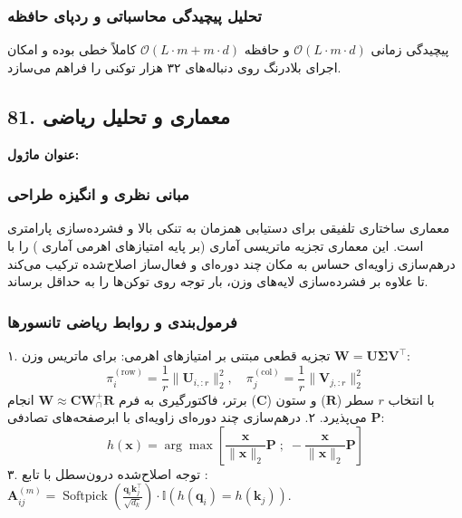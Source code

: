 \subsubsection*{تحلیل پیچیدگی محاسباتی و ردپای حافظه}
پیچیدگی زمانی $\mathcal{O}(L \cdot m \cdot d)$ و حافظه $\mathcal{O}(L \cdot m + m \cdot d)$ کاملاً خطی بوده و امکان اجرای بلادرنگ روی دنباله‌های ۳۲ هزار توکنی را فراهم می‌سازد.


\subsection*{81. معماری و تحلیل ریاضی }
\textbf{عنوان ماژول:} 

\subsubsection*{مبانی نظری و انگیزه طراحی}
معماری  ساختاری تلفیقی برای دستیابی همزمان به تنکی بالا و فشرده‌سازی پارامتری است. این معماری تجزیه ماتریسی آماری  (بر پایه امتیازهای اهرمی آماری ) را با درهم‌سازی زاویه‌ای حساس به مکان چند دوره‌ای و فعال‌ساز اصلاح‌شده  ترکیب می‌کند تا علاوه بر فشرده‌سازی لایه‌های وزن، بار توجه روی توکن‌ها را به حداقل برساند.

\subsubsection*{فرمول‌بندی و روابط ریاضی تانسورها}
۱. تجزیه قطعی  مبتنی بر امتیازهای اهرمی:
برای ماتریس وزن $\mathbf{W} = \mathbf{U} \mathbf{\Sigma} \mathbf{V}^\top$:
\begin{equation}
\pi_i^{(\text{row})} = \frac{1}{r} \|\mathbf{U}_{i, :r}\|_2^2, \quad \pi_j^{(\text{col})} = \frac{1}{r} \|\mathbf{V}_{j, :r}\|_2^2
\end{equation}
با انتخاب $r$ سطر ($\mathbf{R}$) و ستون ($\mathbf{C}$) برتر، فاکتورگیری به فرم $\mathbf{W} \approx \mathbf{C} \mathbf{W}_\cap^+ \mathbf{R}$ انجام می‌پذیرد.
۲. درهم‌سازی چند دوره‌ای زاویه‌ای با ابرصفحه‌های تصادفی $\mathbf{P}$:
\begin{equation}
h(\mathbf{x}) = \arg\max \left[ \frac{\mathbf{x}}{\|\mathbf{x}\|_2} \mathbf{P} \;;\; -\frac{\mathbf{x}}{\|\mathbf{x}\|_2} \mathbf{P} \right]
\end{equation}
۳. توجه اصلاح‌شده درون‌سطل با تابع : $\mathbf{A}_{ij}^{(m)} = \operatorname{Softpick}\left(\frac{\mathbf{q}_i \mathbf{k}_j^\top}{\sqrt{d_k}}\right) \cdot \mathbb{I}(h(\mathbf{q}_i) = h(\mathbf{k}_j))$.


